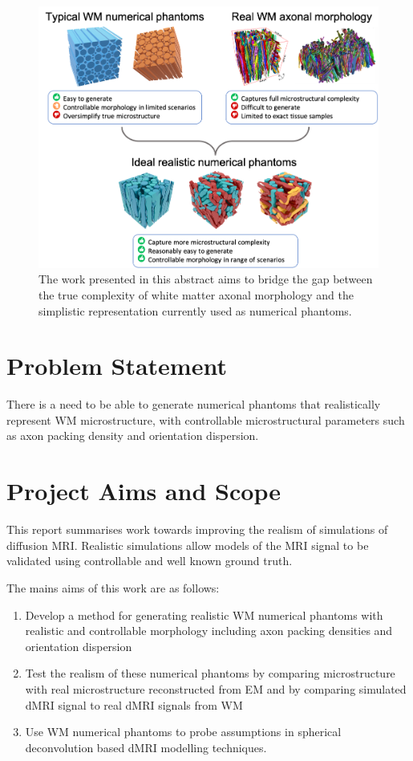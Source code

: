 \begin{figure}
  \centering
  \includegraphics[width=\textwidth]{figures/introduction/overview}
  \caption[Overview of the main goal of the thesis]{The work presented in this abstract aims to bridge the gap between the true complexity of white matter axonal morphology and the simplistic representation currently used as numerical phantoms. }
  \label{fig:intro_overview}
\end{figure}

\section{Problem Statement}
\label{sec:intro_problem_statement}
There is a need to be able to generate numerical phantoms that realistically represent \ac{WM} microstructure, with controllable microstructural parameters such as axon packing density and orientation dispersion.


\section{Project Aims and Scope}
\label{sec:intro_project_aims}
This report summarises work towards improving the realism of simulations of diffusion \ac{MRI}. Realistic simulations allow models of the MRI signal to be validated using controllable and well known ground truth.

 

The mains aims of this work are as follows:
\begin{enumerate}
\item Develop a method for generating realistic \ac{WM} numerical phantoms with realistic and controllable morphology including axon packing densities and orientation dispersion
\item Test the realism of these numerical phantoms by comparing microstructure with real microstructure reconstructed from \acl{EM} and by comparing simulated \ac{dMRI} signal to real \ac{dMRI} signals from \ac{WM}
\item Use \ac{WM} numerical phantoms to probe assumptions in spherical deconvolution based dMRI modelling techniques.
\end{enumerate}

